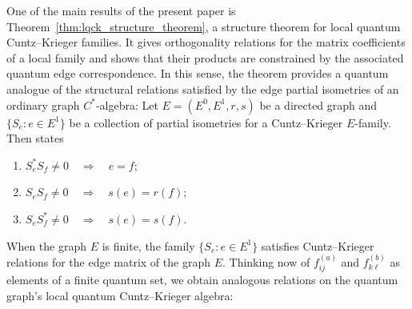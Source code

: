 \documentclass[11pt]{article}
\theoremstyle{plain}
\theoremstyle{nonumberplain}
\theoremstyle{plain}
\theoremstyle{nonumberplain}
\newcommand\1{{\bf 1}}
\newcommand{\<}{\left\langle}
\renewcommand{\>}{\right\rangle}
\begin{document}
One of the main results of the present paper is Theorem~\ref{thm:lqck_structure_theorem}, a structure theorem for local quantum Cuntz–Krieger families. It gives orthogonality relations for the matrix coefficients of a local family and shows that their products are constrained by the associated quantum edge correspondence. In this sense, the theorem provides a quantum analogue of the structural relations satisfied by the edge partial isometries of an ordinary graph $C^*$-algebra: Let $E=(E^0,E^1,r,s)$ be a directed graph and $\{S_e:e\in E^1\}$ be a collection of partial isometries for a Cuntz--Krieger $E$-family. Then \cite[Proposition 1.12]{Rae05} states 
\begin{enumerate}
    \item $S_e^*S_f \neq 0 
    \quad \Longrightarrow \quad 
    e=f$;
    \item $S_e S_f\neq 0
    \quad \Longrightarrow \quad
    s(e)=r(f)$;
    \item $S_eS_f^*\neq 0 
    \quad  \Longrightarrow \quad s(e)=s(f)$.
    \end{enumerate}
When the graph $E$ is finite, the family $\{S_e:e\in E^1\}$ satisfies Cuntz--Krieger relations for the edge matrix of the graph $E$. Thinking now of $f_{ij}^{(a)}$ and $f_{k\ell}^{(b)}$ as elements of a finite quantum set, we obtain analogous relations on the quantum graph's local quantum Cuntz--Krieger algebra:\\
\end{document}
